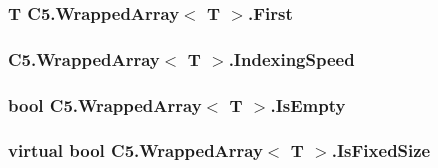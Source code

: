 \subsubsection[{First}]{\setlength{\rightskip}{0pt plus 5cm}T {\bf C5.\+Wrapped\+Array}$<$ T $>$.First\hspace{0.3cm}{\ttfamily [get]}}\label{class_c5_1_1_wrapped_array_a30b1c7c01b288c05e8d7594a1d85f1d5}




\hypertarget{class_c5_1_1_wrapped_array_a9ddee14e5fc0e1c4d2cfe0e3809018f1}{}
\subsubsection[{Indexing\+Speed}]{ {\bf C5.\+Wrapped\+Array}$<$ T $>$.Indexing\+Speed\hspace{0.3cm}{\ttfamily [get]}}\label{class_c5_1_1_wrapped_array_a9ddee14e5fc0e1c4d2cfe0e3809018f1}




\hypertarget{class_c5_1_1_wrapped_array_a63eafa18bd9e15b9f9c606d64500d851}{}
\subsubsection[{Is\+Empty}]{\setlength{\rightskip}{0pt plus 5cm}bool {\bf C5.\+Wrapped\+Array}$<$ T $>$.Is\+Empty\hspace{0.3cm}{\ttfamily [get]}}\label{class_c5_1_1_wrapped_array_a63eafa18bd9e15b9f9c606d64500d851}




\hypertarget{class_c5_1_1_wrapped_array_a05fa96081a5ae212ae531df648d543c5}{}
\subsubsection[{Is\+Fixed\+Size}]{\setlength{\rightskip}{0pt plus 5cm}virtual bool {\bf C5.\+Wrapped\+Array}$<$ T $>$.Is\+Fixed\+Size\hspace{0.3cm}{\ttfamily [get]}}\label{class_c5_1_1_wrapped_array_a05fa96081a5ae212ae531df648d543c5}





